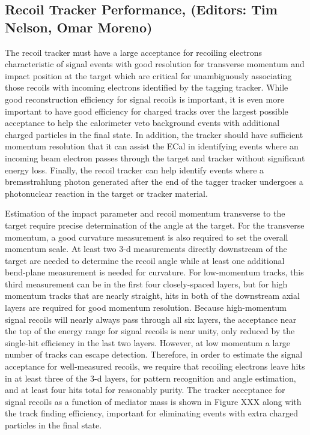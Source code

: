 \subsection{Recoil Tracker Performance, (Editors: Tim Nelson, Omar Moreno)}

The recoil tracker must have a large acceptance for recoiling electrons characteristic of signal events with good resolution for transverse momentum and impact position at the target which are critical for unambiguously associating those recoils with incoming electrons identified by the tagging tracker.  While good reconstruction efficiency for signal recoils is important, it is even more important to have good efficiency for charged tracks over the largest possible acceptance to help the calorimeter veto background events with additional charged particles in the final state.  In addition, the tracker should have sufficient momentum resolution that it can assist the ECal in identifying events where an incoming beam electron passes through the target and tracker without significant energy loss. Finally, the recoil tracker can help identify events where a bremsstrahlung photon generated after the end of the tagger tracker undergoes a photonuclear reaction in the target or tracker material.

Estimation of the impact parameter and recoil momentum transverse to the target require precise determination of the angle at the target.  For the transverse momentum, a good curvature measurement is also required to set the overall momentum scale.  At least two 3-d measurements directly downstream of the target are needed to determine the recoil angle while at least one additional bend-plane measurement is needed for curvature.  For low-momentum tracks, this third measurement can be in the first four closely-spaced layers, but for high momentum tracks that are nearly straight, hits in both of the downstream axial layers are required for good momentum resolution.  Because high-momentum signal recoils will nearly always pass through all six layers, the acceptance near the top of the energy range for signal recoils is near unity, only reduced by the single-hit efficiency in the last two layers. However, at low momentum a large number of tracks can escape detection. Therefore, in order to estimate the signal acceptance for well-measured recoils, we require that recoiling electrons leave hits in at least three of the 3-d layers, for pattern recognition and angle estimation, and at least four hits total for reasonably purity.  The tracker acceptance for signal recoils as a function of mediator mass is shown in Figure XXX along with the track finding efficiency, important for eliminating events with extra charged particles in the final state.


